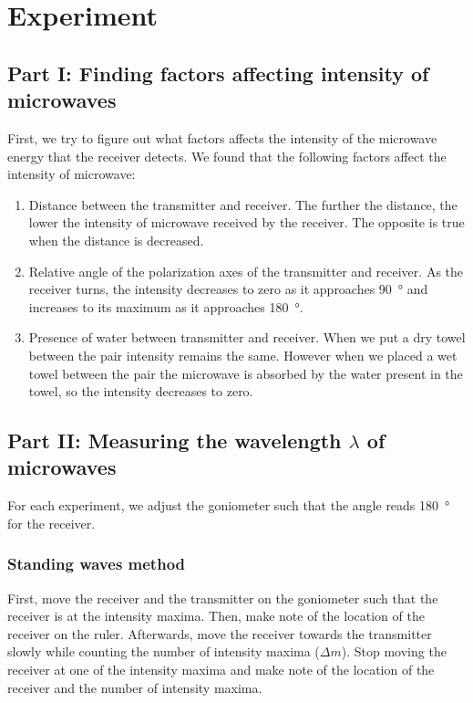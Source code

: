 \documentclass[letter,12pt]{article}
\newcommand{\tlambda}{\(\lambda\) }
\numberwithin{equation}{section}
\numberwithin{figure}{section}
\numberwithin{table}{section}
\begin{document}
\section{Experiment}
\subsection{Part I: Finding factors affecting intensity of microwaves}
First, we try to figure out what factors affects the intensity of the microwave energy that the receiver detects. We found that the following factors affect the intensity of microwave:

\begin{enumerate}
  \item Distance between the transmitter and receiver. The further the distance, the lower the intensity of microwave received by the receiver. The opposite is true when the distance is decreased.
  \item Relative angle of the polarization axes of the transmitter and receiver. As the receiver turns, the intensity decreases to zero as it approaches \SI{90}{\degree} and increases to its maximum as it approaches \SI{180}{\degree}.
  \item Presence of water between transmitter and receiver. When we put a dry towel between the pair intensity remains the same. However when we placed a wet towel between the pair the microwave is absorbed by the water present in the towel, so the intensity decreases to zero.
\end{enumerate}

\subsection{Part II: Measuring the wavelength \tlambda of microwaves}
For each experiment, we adjust the goniometer such that the angle reads \SI{180}{\degree} for the receiver.

\subsubsection{Standing waves method}
First, move the receiver and the transmitter on the goniometer such that the receiver is at the intensity maxima. Then, make note of the location of the receiver on the ruler. Afterwards, move the receiver towards the transmitter slowly while counting the number of intensity maxima (\(\Delta m\)). Stop moving the receiver at one of the intensity maxima and make note of the location of the receiver and the number of intensity maxima.
\end{document}

